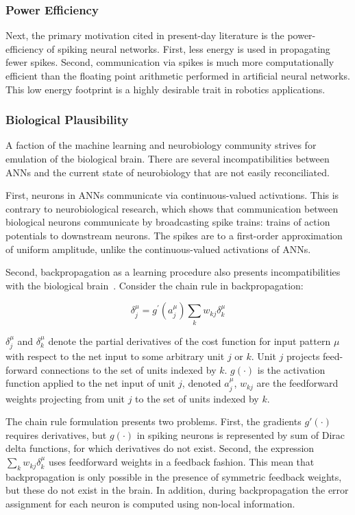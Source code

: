 \documentclass[fyp]{socreport}
\begin{document}
\subsubsection{Power Efficiency}
Next, the primary motivation cited in present-day literature is the
power-efficiency of spiking neural networks. First, less energy is used in
propagating fewer spikes. Second, communication via spikes is much more
computationally efficient than the floating point arithmetic performed in
artificial neural networks. This low energy footprint is a highly desirable
trait in robotics applications.

\subsubsection{Biological Plausibility\label{bioplausible}}
A faction of the machine learning and neurobiology community strives for
emulation of the biological brain. There are several incompatibilities between
ANNs and the current state of neurobiology that are not easily reconciliated.

First, neurons in ANNs communicate via continuous-valued activations.  This is
contrary to neurobiological research, which shows that communication between
biological neurons communicate by broadcasting spike trains: trains of action
potentials to downstream neurons. The spikes are to a first-order approximation
of uniform amplitude, unlike the continuous-valued activations of ANNs.

Second, backpropagation as a learning procedure also presents incompatibilities
with the biological brain~\cite{TAVANAEI201947}. Consider the chain rule in
backpropagation:

\begin{equation}
  \label{chainrule}
  \delta_{j}^{\mu}=g^{\prime}\left(a_{j}^{\mu}\right) \sum_{k} w_{k j} \delta_{k}^{\mu}
\end{equation}

\(\delta_{j}^{\mu}\) and \(\delta_{k}^{\mu}\) denote the partial derivatives of
the cost function for input pattern \(\mu\) with respect to the net input to
some arbitrary unit \(j\) or \(k\). Unit \(j\) projects feed-forward connections
to the set of units indexed by \(k\). \(g(\cdot)\) is the activation function
applied to the net input of unit \(j\), denoted \(a_j^{\mu}\), \(w_{kj}\) are
the feedforward weights projecting from unit \(j\) to the set of units indexed
by \(k\).

The chain rule formulation presents two problems. First, the gradients
\(g'(\cdot)\) requires derivatives, but \(g(\cdot)\) in spiking neurons is
represented by sum of Dirac delta functions, for which derivatives do not
exist. Second, the expression \(\sum_{k} w_{k j} \delta_{k}^{\mu}\) uses
feedforward weights in a feedback fashion. This mean that backpropagation is
only possible in the presence of symmetric feedback weights, but these do not
exist in the brain. In addition, during backpropagation the error assignment for
each neuron is computed using non-local information.
\end{document}
